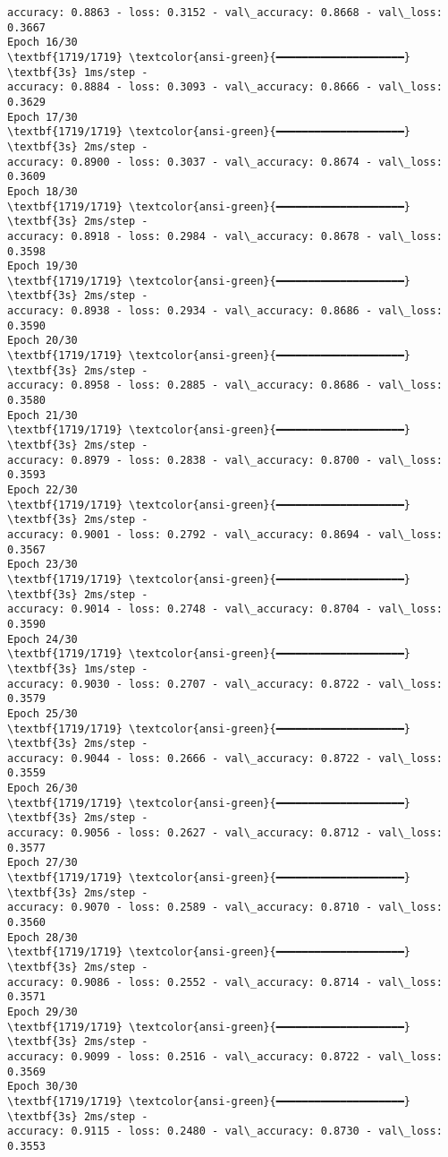 \documentclass[12pt letter]{report}
\begin{document}
\begin{Verbatim}[commandchars=\\\{\}]
accuracy: 0.8863 - loss: 0.3152 - val\_accuracy: 0.8668 - val\_loss: 0.3667
Epoch 16/30
\textbf{1719/1719} \textcolor{ansi-green}{━━━━━━━━━━━━━━━━━━━━} \textbf{3s} 1ms/step -
accuracy: 0.8884 - loss: 0.3093 - val\_accuracy: 0.8666 - val\_loss: 0.3629
Epoch 17/30
\textbf{1719/1719} \textcolor{ansi-green}{━━━━━━━━━━━━━━━━━━━━} \textbf{3s} 2ms/step -
accuracy: 0.8900 - loss: 0.3037 - val\_accuracy: 0.8674 - val\_loss: 0.3609
Epoch 18/30
\textbf{1719/1719} \textcolor{ansi-green}{━━━━━━━━━━━━━━━━━━━━} \textbf{3s} 2ms/step -
accuracy: 0.8918 - loss: 0.2984 - val\_accuracy: 0.8678 - val\_loss: 0.3598
Epoch 19/30
\textbf{1719/1719} \textcolor{ansi-green}{━━━━━━━━━━━━━━━━━━━━} \textbf{3s} 2ms/step -
accuracy: 0.8938 - loss: 0.2934 - val\_accuracy: 0.8686 - val\_loss: 0.3590
Epoch 20/30
\textbf{1719/1719} \textcolor{ansi-green}{━━━━━━━━━━━━━━━━━━━━} \textbf{3s} 2ms/step -
accuracy: 0.8958 - loss: 0.2885 - val\_accuracy: 0.8686 - val\_loss: 0.3580
Epoch 21/30
\textbf{1719/1719} \textcolor{ansi-green}{━━━━━━━━━━━━━━━━━━━━} \textbf{3s} 2ms/step -
accuracy: 0.8979 - loss: 0.2838 - val\_accuracy: 0.8700 - val\_loss: 0.3593
Epoch 22/30
\textbf{1719/1719} \textcolor{ansi-green}{━━━━━━━━━━━━━━━━━━━━} \textbf{3s} 2ms/step -
accuracy: 0.9001 - loss: 0.2792 - val\_accuracy: 0.8694 - val\_loss: 0.3567
Epoch 23/30
\textbf{1719/1719} \textcolor{ansi-green}{━━━━━━━━━━━━━━━━━━━━} \textbf{3s} 2ms/step -
accuracy: 0.9014 - loss: 0.2748 - val\_accuracy: 0.8704 - val\_loss: 0.3590
Epoch 24/30
\textbf{1719/1719} \textcolor{ansi-green}{━━━━━━━━━━━━━━━━━━━━} \textbf{3s} 1ms/step -
accuracy: 0.9030 - loss: 0.2707 - val\_accuracy: 0.8722 - val\_loss: 0.3579
Epoch 25/30
\textbf{1719/1719} \textcolor{ansi-green}{━━━━━━━━━━━━━━━━━━━━} \textbf{3s} 2ms/step -
accuracy: 0.9044 - loss: 0.2666 - val\_accuracy: 0.8722 - val\_loss: 0.3559
Epoch 26/30
\textbf{1719/1719} \textcolor{ansi-green}{━━━━━━━━━━━━━━━━━━━━} \textbf{3s} 2ms/step -
accuracy: 0.9056 - loss: 0.2627 - val\_accuracy: 0.8712 - val\_loss: 0.3577
Epoch 27/30
\textbf{1719/1719} \textcolor{ansi-green}{━━━━━━━━━━━━━━━━━━━━} \textbf{3s} 2ms/step -
accuracy: 0.9070 - loss: 0.2589 - val\_accuracy: 0.8710 - val\_loss: 0.3560
Epoch 28/30
\textbf{1719/1719} \textcolor{ansi-green}{━━━━━━━━━━━━━━━━━━━━} \textbf{3s} 2ms/step -
accuracy: 0.9086 - loss: 0.2552 - val\_accuracy: 0.8714 - val\_loss: 0.3571
Epoch 29/30
\textbf{1719/1719} \textcolor{ansi-green}{━━━━━━━━━━━━━━━━━━━━} \textbf{3s} 2ms/step -
accuracy: 0.9099 - loss: 0.2516 - val\_accuracy: 0.8722 - val\_loss: 0.3569
Epoch 30/30
\textbf{1719/1719} \textcolor{ansi-green}{━━━━━━━━━━━━━━━━━━━━} \textbf{3s} 2ms/step -
accuracy: 0.9115 - loss: 0.2480 - val\_accuracy: 0.8730 - val\_loss: 0.3553
    \end{Verbatim}
\end{document}
